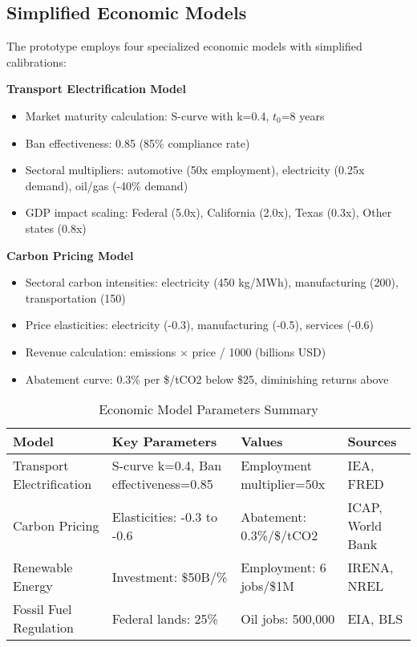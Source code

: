 \documentclass[conference]{IEEEtran}
\begin{document}
\subsection{Simplified Economic Models}

The prototype employs four specialized economic models with simplified calibrations:

\textbf{Transport Electrification Model}
\begin{itemize}
\item Market maturity calculation: S-curve with k=0.4, $t_0$=8 years
\item Ban effectiveness: 0.85 (85\% compliance rate)
\item Sectoral multipliers: automotive (50x employment), electricity (0.25x demand), oil/gas (-40\% demand)
\item GDP impact scaling: Federal (5.0x), California (2.0x), Texas (0.3x), Other states (0.8x)
\end{itemize}

\textbf{Carbon Pricing Model}
\begin{itemize}
\item Sectoral carbon intensities: electricity (450 kg/MWh), manufacturing (200), transportation (150)
\item Price elasticities: electricity (-0.3), manufacturing (-0.5), services (-0.6)
\item Revenue calculation: emissions $\times$ price / 1000 (billions USD)
\item Abatement curve: 0.3\% per \$/tCO2 below \$25, diminishing returns above
\end{itemize}

\begin{table}[htbp]
\caption{Economic Model Parameters Summary}
\begin{center}
\begin{tabular}{|p{2cm}|p{2.5cm}|p{1.5cm}|p{1cm}|}
\hline
\textbf{Model} & \textbf{Key Parameters} & \textbf{Values} & \textbf{Sources} \\
\hline
Transport Electrification & S-curve k=0.4, Ban effectiveness=0.85 & Employment multiplier=50x & IEA, FRED \\
\hline
Carbon Pricing & Elasticities: -0.3 to -0.6 & Abatement: 0.3\%/\$/tCO2 & ICAP, World Bank \\
\hline
Renewable Energy & Investment: \$50B/\% & Employment: 6 jobs/\$1M & IRENA, NREL \\
\hline
Fossil Fuel Regulation & Federal lands: 25\% & Oil jobs: 500,000 & EIA, BLS \\
\hline
\end{tabular}
\label{tab:model_params}
\end{center}
\end{table}
\end{document}
